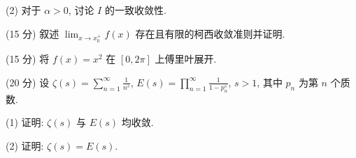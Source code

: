 (2) 对于 $\alpha > 0$, 讨论 $I$ 的一致收敛性.\par
\par{}
(15 分) 叙述 $\lim_{x \to x_0^+} f(x)$ 存在且有限的柯西收敛准则并证明.\par
\par{}
(15 分) 将 $f(x) = x^2$ 在 $[0, 2\pi]$ 上傅里叶展开.\par
\par{}
(20 分) 设 $\zeta(s) = \sum_{n=1}^{\infty} \frac{1}{n^s}$, $E(s) = \prod_{n=1}^{\infty} \frac{1}{1 - p_n^s}$, $s > 1$, 其中 $p_n$ 为第 $n$ 个质数.\par
(1) 证明: $\zeta(s)$ 与 $E(s)$ 均收敛.\par
(2) 证明: $\zeta(s) = E(s)$.\par
